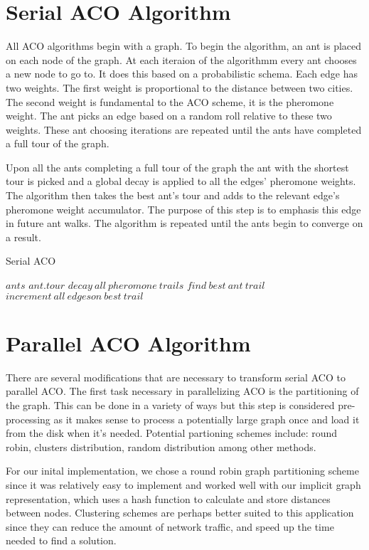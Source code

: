 \documentclass{acm_proc_article-sp}
\begin{document}
\section{Serial ACO Algorithm}
All ACO algorithms begin with a graph. To begin the algorithm, an ant is placed on each node of the graph.
At each iteraion of the algorithmm every ant chooses a new node to go to. It does this based on a probabilistic 
schema. Each edge has two weights. The first weight is proportional to the distance between two cities. The second
weight is fundamental to the ACO scheme, it is the pheromone weight. The ant picks an edge based on a random roll
relative to these two weights. These ant choosing iterations are repeated until the ants have completed a full tour
of the graph. 

Upon all the ants completing a full tour of the graph the ant with the shortest tour is picked and a global decay is
applied to all the edges' pheromone weights. The algorithm then takes the best ant's tour and adds to the relevant 
edge's pheromone weight accumulator. The purpose of this step is to emphasis this edge in future ant walks. The algorithm
is repeated until the ants begin to converge on a result. 

\caption{Serial ACO}
\begin{algorithmic}[1]
        \State $ants$  
                \State $ ant.tour $
            \EndFor
            \State $ decay\ all\ pheromone\ trails $
            \State $ find\ best\ ant\ trail $
            \State $ increment\ all\ edges on\ best\ trail $
        \EndWhile
    \EndProcedure
\end{algorithmic}

\section{Parallel ACO Algorithm}
There are several modifications that are necessary to transform serial ACO to parallel ACO. The first task
necessary in parallelizing ACO is the partitioning of the graph. This can be done in a variety of ways but 
this step is considered pre-processing as it makes sense to process a potentially large graph once and load it
from the disk when it's needed. Potential partioning schemes include: round robin, clusters distribution, 
random distribution among other methods.

For our inital implementation, we chose a round robin graph partitioning scheme since it was relatively easy to implement
and worked well with our implicit graph representation, which uses a hash function to calculate and store distances between
nodes. Clustering schemes are perhaps better suited to this application since they can reduce the amount of network traffic,
and speed up the time needed to find a solution.
\end{document}

